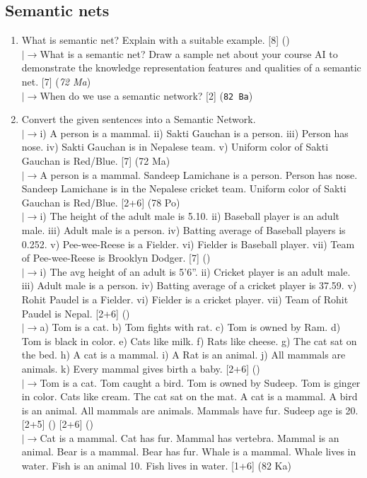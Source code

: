 \documentclass[12pt]{article}
\newcommand{\lb}{\\$\left|\rightarrow\right.$}
\begin{document}
  \subsection{Semantic nets}
    \begin{enumerate}[topsep=0pt, noitemsep]
      \item What is semantic net? Explain with a suitable example. \hfill [8] ()
        \lb What is a semantic net? Draw a sample net about your course AI to demonstrate the knowledge representation features and qualities of a semantic net. \hfill [7] (\textit{72 Ma})
        \lb When do we use a semantic network? \hfill [2] (\texttt{82 Ba})

      \item Convert the given sentences into a Semantic Network.
        \lb i) A person is a mammal. ii) Sakti Gauchan is a person. iii) Person has nose. iv) Sakti Gauchan is in Nepalese team. v) Uniform color of Sakti Gauchan is Red/Blue. \hfill [7] (72 Ma)
        \lb A person is a mammal. Sandeep Lamichane is a person. Person has nose. Sandeep Lamichane is in the Nepalese cricket team. Uniform color of Sakti Gauchan is Red/Blue. \hfill [2+6] (78 Po)
        \lb i) The height of the adult male is 5.10. ii) Baseball player is an adult male. iii) Adult male is a person. iv) Batting average of Baseball players is 0.252. v) Pee-wee-Reese is a Fielder. vi) Fielder is Baseball player. vii) Team of Pee-wee-Reese is Brooklyn Dodger. \hfill [7] ()
        \lb i) The avg height of an adult is 5'6''. ii) Cricket player is an adult male. iii) Adult male is a person. iv) Batting average of a cricket player is 37.59. v) Rohit Paudel is a Fielder. vi) Fielder is a cricket player. vii) Team of Rohit Paudel is Nepal. \hfill [2+6] ()
        \lb a) Tom is a cat. b) Tom fights with rat. c) Tom is owned by Ram. d) Tom is black in color. e) Cats like milk. f) Rats like cheese. g) The cat sat on the bed. h) A cat is a mammal. i) A Rat is an animal. j) All mammals are animals. k) Every mammal gives birth a baby. \hfill [2+6] ()
        \lb Tom is a cat. Tom caught a bird. Tom is owned by Sudeep. Tom is ginger in color. Cats like cream. The cat sat on the mat. A cat is a mammal. A bird is an animal. All mammals are animals. Mammals have fur. Sudeep age is 20. \hfill [2+5] () [2+6] ()
        \lb Cat is a mammal. Cat has fur. Mammal has vertebra. Mammal is an animal. Bear is a mammal. Bear has fur. Whale is a mammal. Whale lives in water. Fish is an animal 10. Fish lives in water. \hfill [1+6] (82 Ka)

\end{enumerate}
\end{document}
